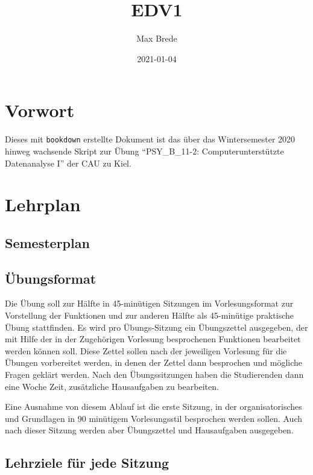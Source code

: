 \documentclass[
]{book}
\title{EDV1}
\author{Max Brede}
\date{2021-01-04}
\begin{document}
\maketitle

{
\setcounter{tocdepth}{1}
\tableofcontents
}
\hypertarget{vorwort}{%
\chapter{Vorwort}\label{vorwort}}

Dieses mit \texttt{bookdown} erstellte Dokument ist das über das Wintersemester 2020 hinweg wachsende Skript zur Übung ``PSY\_B\_11-2: Computerunterstützte Datenanalyse I'' der CAU zu Kiel.

\hypertarget{lehrplan}{%
\chapter{Lehrplan}\label{lehrplan}}

\hypertarget{semesterplan}{%
\section{Semesterplan}\label{semesterplan}}

\hypertarget{uxfcbungsformat}{%
\section{Übungsformat}\label{uxfcbungsformat}}

Die Übung soll zur Hälfte in 45-minütigen Sitzungen im Vorlesungsformat zur Vorstellung der Funktionen und zur anderen Hälfte als 45-minütige praktische Übung stattfinden.
Es wird pro Übungs-Sitzung ein Übungszettel ausgegeben, der mit Hilfe der in der Zugehörigen Vorlesung besprochenen Funktionen bearbeitet werden können soll.
Diese Zettel sollen nach der jeweiligen Vorlesung für die Übungen vorbereitet werden, in denen der Zettel dann besprochen und mögliche Fragen geklärt werden.
Nach den Übungssitzungen haben die Studierenden dann eine Woche Zeit, zusätzliche Hausaufgaben zu bearbeiten.

Eine Ausnahme von diesem Ablauf ist die erste Sitzung, in der organisatorisches und Grundlagen in 90 minütigem Vorlesungsstil besprochen werden sollen. Auch nach dieser Sitzung werden aber Übungszettel und Hausaufgaben ausgegeben.

\hypertarget{lehrziele-fuxfcr-jede-sitzung}{%
\section{Lehrziele für jede Sitzung}\label{lehrziele-fuxfcr-jede-sitzung}}
\end{document}
